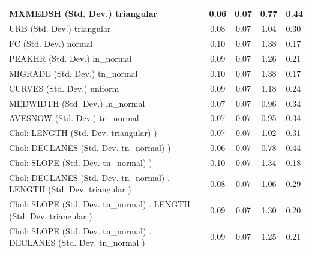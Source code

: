 \begin{table}
\begin{center}
\begin{tabular}{|l|l|c|c|c|l|}
			MXMEDSH (Std. Dev.) triangular &  & 0.06 & 0.07 & 0.77 & 0.44 \\
			\hline
			URB (Std. Dev.) triangular &  & 0.08 & 0.07 & 1.04 & 0.30 \\
			\hline
			FC (Std. Dev.) normal &  & 0.10 & 0.07 & 1.38 & 0.17 \\
			\hline
			PEAKHR (Std. Dev.) ln_normal &  & 0.09 & 0.07 & 1.26 & 0.21 \\
			\hline
			MIGRADE (Std. Dev.) tn_normal &  & 0.10 & 0.07 & 1.38 & 0.17 \\
			\hline
			CURVES (Std. Dev.) uniform &  & 0.09 & 0.07 & 1.18 & 0.24 \\
			\hline
			MEDWIDTH (Std. Dev.) ln_normal &  & 0.07 & 0.07 & 0.96 & 0.34 \\
			\hline
			AVESNOW (Std. Dev.) tn_normal &  & 0.07 & 0.07 & 0.95 & 0.34 \\
			\hline
			 Chol: LENGTH (Std. Dev. triangular) ) &  & 0.07 & 0.07 & 1.02 & 0.31 \\
			\hline
			 Chol: DECLANES (Std. Dev. tn_normal) ) &  & 0.06 & 0.07 & 0.78 & 0.44 \\
			\hline
			 Chol: SLOPE (Std. Dev. tn_normal) ) &  & 0.10 & 0.07 & 1.34 & 0.18 \\
			\hline
			 Chol: DECLANES (Std. Dev. tn_normal) . LENGTH (Std. Dev.   triangular ) &  & 0.08 & 0.07 & 1.06 & 0.29 \\
			\hline
			 Chol: SLOPE (Std. Dev. tn_normal) . LENGTH (Std. Dev.   triangular ) &  & 0.09 & 0.07 & 1.30 & 0.20 \\
			\hline
			 Chol: SLOPE (Std. Dev. tn_normal) . DECLANES (Std. Dev.   tn_normal ) &  & 0.09 & 0.07 & 1.25 & 0.21 \\
			\hline
		\end{tabular}
	\end{center}
\end{table}
